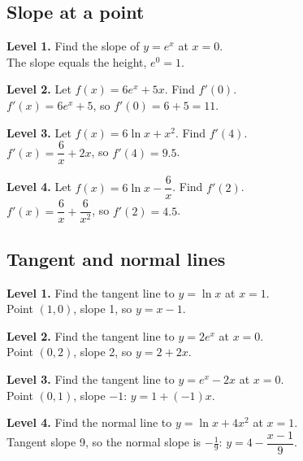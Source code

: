 \documentclass[11pt]{article}
\begin{document}
\subsection*{Slope at a point}
\noindent\textbf{Level 1.} Find the slope of $y=e^{x}$ at $x=0$.\\  \quad The slope equals the height, $e^{0}=1$.\par\medskip
\noindent\textbf{Level 2.} Let $f(x)=6e^{x}+5x$. Find $f'(0)$.\\  \quad $f'(x)=6e^{x}+5$, so $f'(0)=6+5=11$.\par\medskip
\noindent\textbf{Level 3.} Let $f(x)=6\ln x+x^{2}$. Find $f'(4)$.\\  \quad $f'(x)=\dfrac{6}{x}+2x$, so $f'(4)=9.5$.\par\medskip
\noindent\textbf{Level 4.} Let $f(x)=6\ln x-\dfrac{6}{x}$. Find $f'(2)$.\\  \quad $f'(x)=\dfrac{6}{x}+\dfrac{6}{x^{2}}$, so $f'(2)=4.5$.\par\medskip
\subsection*{Tangent and normal lines}
\noindent\textbf{Level 1.} Find the tangent line to $y=\ln x$ at $x=1$.\\  \quad Point $(1,0)$, slope 1, so $y=x-1$.\par\medskip
\noindent\textbf{Level 2.} Find the tangent line to $y=2e^{x}$ at $x=0$.\\  \quad Point $(0,2)$, slope 2, so $y=2+2x$.\par\medskip
\noindent\textbf{Level 3.} Find the tangent line to $y=e^{x}-2x$ at $x=0$.\\  \quad Point $(0,1)$, slope $-1$: $y=1+(-1)x$.\par\medskip
\noindent\textbf{Level 4.} Find the normal line to $y=\ln x+4x^{2}$ at $x=1$.\\  \quad Tangent slope 9, so the normal slope is $-\tfrac{1}{9}$: $y=4-\dfrac{x-1}{9}$.\par\medskip
\end{document}

